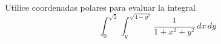 \item Utilice coordenadas polares para evaluar la integral
\[ \int_0^{\sqrt{2}} \int_y^{\sqrt{4-y^2}} \frac{1}{1 + x^2 + y^2} \, dx \, dy \]
